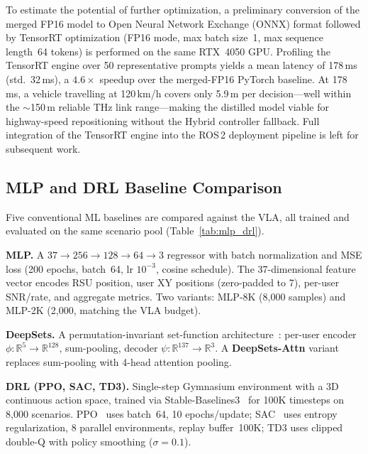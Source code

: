 \documentclass[journal]{IEEEtran}
\begin{document}
To estimate the potential of further optimization, a preliminary conversion of the merged FP16 model to Open Neural Network Exchange (ONNX) format followed by TensorRT optimization (FP16 mode, max batch size~1, max sequence length~64 tokens) is performed on the same RTX~4050 GPU. Profiling the TensorRT engine over 50 representative prompts yields a mean latency of 178\,ms (std.~32\,ms), a $4.6\times$ speedup over the merged-FP16 PyTorch baseline. At 178\,ms, a vehicle travelling at 120\,km/h covers only 5.9\,m per decision---well within the ${\sim}$150\,m reliable THz link range---making the distilled model viable for highway-speed repositioning without the Hybrid controller fallback. Full integration of the TensorRT engine into the ROS\,2 deployment pipeline is left for subsequent work.


\subsection{MLP and DRL Baseline Comparison}
\label{sec:mlp_drl}

Five conventional ML baselines are compared against the VLA, all trained and evaluated on the same scenario pool (Table~\ref{tab:mlp_drl}).

\textbf{MLP.} A $37 \to 256 \to 128 \to 64 \to 3$ regressor with batch normalization and MSE loss (200 epochs, batch~64, lr $10^{-3}$, cosine schedule). The 37-dimensional feature vector encodes RSU position, user XY positions (zero-padded to 7), per-user SNR/rate, and aggregate metrics. Two variants: MLP-8K (8{,}000 samples) and MLP-2K (2{,}000, matching the VLA budget).

\textbf{DeepSets.} A permutation-invariant set-function architecture~\cite{zaheer2017deepsets}: per-user encoder $\phi: \mathbb{R}^5 \to \mathbb{R}^{128}$, sum-pooling, decoder $\psi: \mathbb{R}^{137} \to \mathbb{R}^3$. A \textbf{DeepSets-Attn} variant replaces sum-pooling with 4-head attention pooling.

\textbf{DRL (PPO, SAC, TD3).} Single-step Gymnasium environment with a 3D continuous action space, trained via Stable-Baselines3~\cite{raffin2021sb3} for 100K timesteps on 8{,}000 scenarios. PPO~\cite{schulman2017ppo} uses batch~64, 10 epochs/update; SAC~\cite{haarnoja2018sac} uses entropy regularization, 8 parallel environments, replay buffer~100K; TD3 uses clipped double-Q with policy smoothing ($\sigma{=}0.1$).
\end{document}
